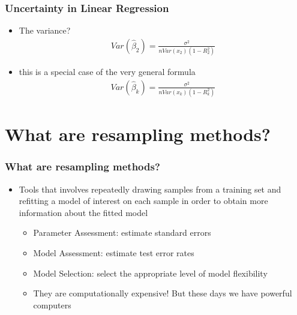 \documentclass[
  shownotes,
  xcolor={svgnames},
  hyperref={colorlinks,citecolor=DarkBlue,linkcolor=andesred,urlcolor=DarkBlue}
  , aspectratio=169]{beamer}
\begin{document}
\begin{frame}
\frametitle{ Uncertainty in Linear Regression}
\begin{itemize}
  \item The variance?
  \medskip
  \begin{align}
    Var(\hat{\beta}_{2})=\frac{\sigma^2}{n Var(x_2)(1-R^2_2)}
  \end{align}
   \medskip
   \item this is a special case of the very general formula
  \begin{align}
    Var(\hat{\beta}_{k})=\frac{\sigma^2}{n Var(x_k)(1-R^2_k)}
  \end{align}
  
\end{itemize}
\end{frame}
\section{What are resampling methods?}
\begin{frame}[fragile]
\frametitle{What are resampling methods?}

\begin{itemize}
\item Tools that involves repeatedly drawing samples from a training set and refitting a model of interest on each sample in order to obtain more information about the fitted model
\medskip
\begin{itemize}
  \item Parameter Assessment: estimate standard errors
  \medskip
  \item Model Assessment: estimate test error rates 
  \medskip
  \item Model Selection: select the appropriate level of model flexibility
  \medskip
  \item They are computationally expensive! But these days we have powerful computers
\end{itemize}
\end{itemize}

\end{frame}

\end{document}
